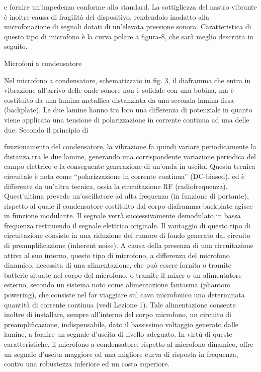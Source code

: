 e fornire un’impedenza conforme allo standard. La sottigliezza del nastro vibrante è inoltre causa di fragilità del dispositivo, rendendolo inadatto alla microfonazione di segnali dotati di un’elevata pressione sonora. Caratteristica di questo tipo di microfono è la curva polare a figura-8, che sarà meglio descritta in seguito.

Microfoni a condensatore

Nel microfono a condensatore, schematizzato in fig. 3, il diaframma che entra in vibrazione all’arrivo delle onde sonore non è solidale con una bobina, ma è costituito da una lamina metallica distanziata da una seconda lamina fissa (backplate). Le due lamine hanno tra loro una differenza di potenziale in quanto viene applicata una tensione di polarizzazione in corrente continua ad una delle due. Secondo il principio di

funzionamento del condensatore, la vibrazione fa quindi variare periodicamente la distanza tra le due lamine, generando una corrispondente variazione periodica del campo elettrico e la conseguente generazione di un’onda in uscita. Questa tecnica circuitale è nota come “polarizzazione in corrente continua” (DC-biased), ed è differente da un’altra tecnica, ossia la circuitazione RF (radiofrequenza). Quest’ultima prevede un’oscillatore ad alta frequenza (in funzione di portante), rispetto al quale il condensatore costituito dal corpo diaframma-backplate agisce in funzione modulante. Il segnale verrà successivamente demodulato in bassa frequenza restituendo il segnale elettrico originale. Il vantaggio di questo tipo di circuitazione consiste in una riduzione del rumore di fondo generato dal circuito di preamplificazione (inherent noise).
A causa della presenza di una circuitazione attiva al suo interno, questo tipo di microfono, a differenza del microfono dinamico, necessita di una alimentazione, che può essere fornita o tramite batterie situate nel corpo del microfono, o tramite il mixer o un alimentatore esterno, secondo un sistema noto come alimentazione fantasma (phantom powering), che consiste nel far viaggiare sul cavo microfonico una determinata quantità di corrente continua (vedi Lezione 1). Tale alimentazione consente inoltre di installare, sempre all’interno del corpo microfono, un circuito di preamplificazione, indispensabile, dato il bassissimo voltaggio generato dalle lamine, a fornire un segnale d’uscita di livello adeguato.
In virtù di queste caratteristiche, il microfono a condensatore, rispetto al microfono dinamico, offre un segnale d’uscita maggiore ed una migliore curva di risposta in frequenza, contro una robustezza inferiore ed un costo superiore.

